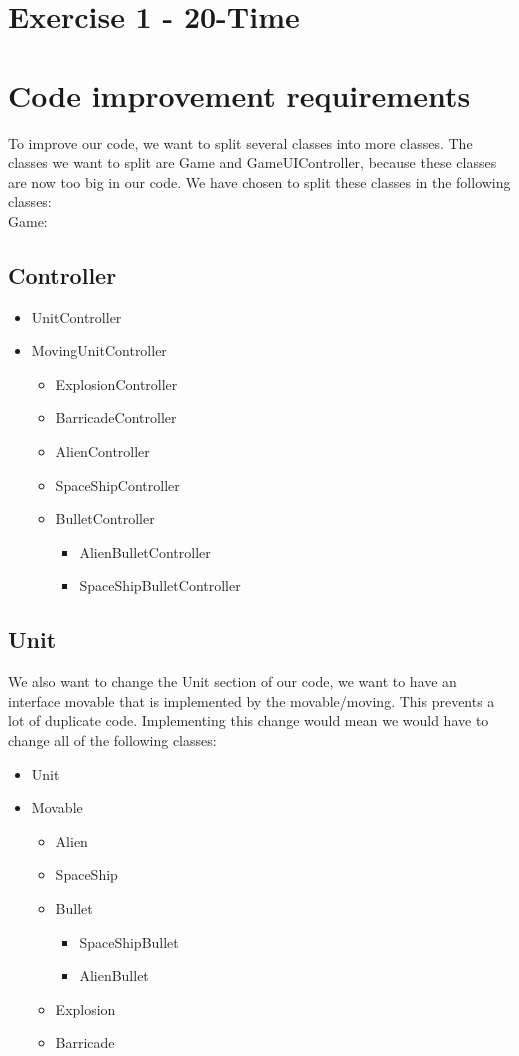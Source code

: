 \section*{Exercise 1 - 20-Time}
\section*{Code improvement requirements}
To improve our code, we want to split several classes into more classes. The classes we want to split are Game and GameUIController, because these classes are now too big in our code. We have chosen to split these classes in the following classes:\\
Game:\newline
\subsection*{Controller}
\begin{itemize}
	\item UnitController
	\item MovingUnitController
	\begin{itemize}
	\item ExplosionController
	\item BarricadeController	
	\item AlienController
	\item SpaceShipController
	\item BulletController
		\begin{itemize}
			\item AlienBulletController
			\item SpaceShipBulletController
		\end{itemize}
	\end{itemize}
\end{itemize}
\subsection*{Unit}
We also want to change the Unit section of our code, we want to have an interface movable that is implemented by the movable/moving. This prevents a lot of duplicate code. Implementing this change would mean we would have to change all of the following classes:
	\begin{itemize}
	\item Unit
	\item Movable
		\begin{itemize}
		\item Alien
		\item SpaceShip
		\item Bullet
		\begin{itemize}
			\item SpaceShipBullet
			\item AlienBullet
		\end{itemize}
		\item Explosion
		\item Barricade
	\end{itemize}
\end{itemize}

